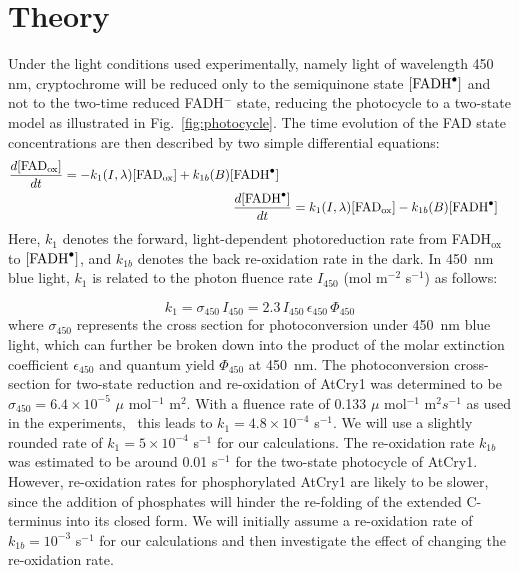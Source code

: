 \documentclass[twoside,twocolumn,9pt]{article}
\begin{document}
\section{Theory}
Under the light conditions used experimentally, namely light of wavelength 450 nm, \cite{Pooam2019, Hammad2019} cryptochrome will 
be reduced only to the semiquinone state $[\ce{FADH^{.}}]$ and not to the two-time reduced FADH$^-$ state, reducing the photocycle 
to a two-state model \cite{Procopio2016} as illustrated in Fig.~\ref{fig:photocycle}. The time evolution of the FAD state 
concentrations are then described by two simple differential equations:
\begin{subequations} \label{eq:ODE}
	\begin{align}
	\begin{split}
	\frac{d[\text{FAD}_{\text{ox}}]}{dt} & = -k_{1}(I, \lambda) [\text{FAD}_{\text{ox}}] + k_{1b}(B) [\ce{FADH^{.}}]
	\end{split} 			
	\\	
	\frac{d[\ce{FADH^{.}}]}{dt} & = k_{1}(I, \lambda) [\text{FAD}_{\text{ox}}] - k_{1b}(B) [\ce{FADH^{.}}]
	\end{align}
\end{subequations}
Here, $k_{1}$ denotes the forward, light-dependent photoreduction rate from FADH$_{\text{ox}}$ to $[\ce{FADH^{.}}]$, and $k_{1b}$ 
denotes the back re-oxidation rate in the dark. In 450~nm blue light, $k_{1}$ is related to the photon fluence rate $I_{450}$ (mol 
m$^{-2}$ s$^{-1}$) as follows: \cite{Kendrick94}

\begin{equation}
	k_{1} = \sigma_{450} \, I_{450} = 2.3 \, I_{450} \, \epsilon_{450} \, \Phi_{450}
\end{equation}
where $\sigma_{450}$ represents the cross section for photoconversion under 450~nm blue light, which can further be broken down 
into the product of the molar extinction coefficient $\epsilon_{450}$ and quantum yield $\Phi_{450}$ at 450~nm. The photoconversion 
cross-section for two-state reduction and re-oxidation of AtCry1 was determined to be $\sigma_{450} = 6.4 \times 10^{-5}$ $\mu$ 
mol$^{-1}$ m$^{2}$. With a fluence rate of 0.133 $\mu$ mol$^{-1}$ m$^{2} s^{-1}$ as used in the experiments,~\cite{Hammad2019} this 
leads to $k_{1} = 4.8 \times 10^{-4}$ s$^{-1}$. We will use a slightly rounded rate of $k_{1} = 5 \times 10^{-4}$ s$^{-1}$ for our 
calculations. The re-oxidation rate $k_{1b}$ was estimated to be around 0.01 s$^{-1}$ for the two-state photocycle of AtCry1. 
\cite{Procopio2016} However, re-oxidation rates for phosphorylated AtCry1 are likely to be slower, since the addition of phosphates 
will hinder the re-folding of the extended C-terminus into its closed form. We will initially assume a re-oxidation rate of $k_{1b} 
= 10^{-3}$ s$^{-1}$ for our calculations and then investigate the effect of changing the re-oxidation rate.
\end{document}
